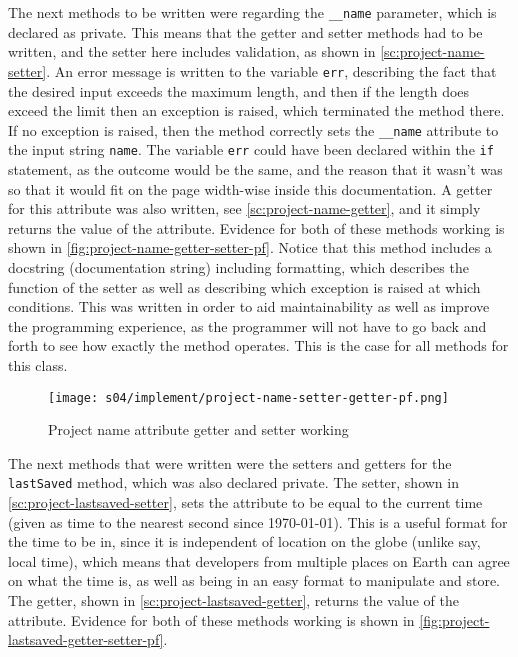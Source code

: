         The next methods to be written were regarding the \verb|__name| parameter, which is declared as private. This means that the getter and setter methods had to be written, and the setter here includes validation, as shown in \autoref{sc:project-name-setter}. 
        An error message is written to the variable \verb|err|, describing the fact that the desired input exceeds the maximum length, and then if the length does exceed the limit then an exception is raised, which terminated the method there. 
        If no exception is raised, then the method correctly sets the \verb|__name| attribute to the input string \verb|name|.
        The variable \verb|err| could have been declared within the \verb|if| statement, as the outcome would be the same, and the reason that it wasn't was so that it would fit on the page width-wise inside this documentation. 
        A getter for this attribute was also written, see \autoref{sc:project-name-getter}, and it simply returns the value of the attribute.
        Evidence for both of these methods working is shown in \autoref{fig:project-name-getter-setter-pf}.
        Notice that this method includes a docstring (documentation string) including formatting, which describes the function of the setter as well as describing which exception is raised at which conditions.
        This was written in order to aid maintainability as well as improve the programming experience, as the programmer will not have to go back and forth to see how exactly the method operates. 
        This is the case for all methods for this class. 

        \begin{figure}[!ht]
            \centering
            \texttt{[image: s04/implement/project-name-setter-getter-pf.png]}
            \caption{Project name attribute getter and setter working}
            \label{fig:project-name-getter-setter-pf}
        \end{figure}

        The next methods that were written were the setters and getters for the \verb|lastSaved| method, which was also declared private. 
        The setter, shown in \autoref{sc:project-lastsaved-setter}, sets the attribute to be equal to the current time (given as time to the nearest second since 1970-01-01). 
        This is a useful format for the time to be in, since it is independent of location on the globe (unlike say, local time), which means that developers from multiple places on Earth can agree on what the time is, as well as being in an easy format to manipulate and store. 
        The getter, shown in \autoref{sc:project-lastsaved-getter}, returns the value of the attribute. 
        Evidence for both of these methods working is shown in \autoref{fig:project-lastsaved-getter-setter-pf}.

